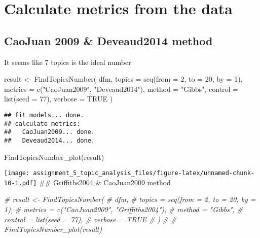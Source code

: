 \documentclass[
]{article}
\newenvironment{Shaded}{\begin{snugshade}}{\end{snugshade}}
\newcommand{\AttributeTok}[1]{\textcolor[rgb]{0.77,0.63,0.00}{#1}}
\newcommand{\CommentTok}[1]{\textcolor[rgb]{0.56,0.35,0.01}{\textit{#1}}}
\newcommand{\ConstantTok}[1]{\textcolor[rgb]{0.00,0.00,0.00}{#1}}
\newcommand{\DecValTok}[1]{\textcolor[rgb]{0.00,0.00,0.81}{#1}}
\newcommand{\FunctionTok}[1]{\textcolor[rgb]{0.00,0.00,0.00}{#1}}
\newcommand{\NormalTok}[1]{#1}
\newcommand{\OtherTok}[1]{\textcolor[rgb]{0.56,0.35,0.01}{#1}}
\newcommand{\StringTok}[1]{\textcolor[rgb]{0.31,0.60,0.02}{#1}}
\begin{document}
\hypertarget{calculate-metrics-from-the-data}{%
\section{Calculate metrics from the
data}\label{calculate-metrics-from-the-data}}

\hypertarget{caojuan-2009-deveaud2014-method}{%
\subsection{CaoJuan 2009 \& Deveaud2014
method}\label{caojuan-2009-deveaud2014-method}}

It seems like 7 topics is the ideal number

\begin{Shaded}
\begin{Highlighting}[]
\NormalTok{result }\OtherTok{\textless{}{-}} \FunctionTok{FindTopicsNumber}\NormalTok{(}
\NormalTok{  dfm,}
  \AttributeTok{topics =} \FunctionTok{seq}\NormalTok{(}\AttributeTok{from =} \DecValTok{2}\NormalTok{, }\AttributeTok{to =} \DecValTok{20}\NormalTok{, }\AttributeTok{by =} \DecValTok{1}\NormalTok{),}
  \AttributeTok{metrics =} \FunctionTok{c}\NormalTok{(}\StringTok{"CaoJuan2009"}\NormalTok{,  }\StringTok{"Deveaud2014"}\NormalTok{),}
  \AttributeTok{method =} \StringTok{"Gibbs"}\NormalTok{,}
  \AttributeTok{control =} \FunctionTok{list}\NormalTok{(}\AttributeTok{seed =} \DecValTok{77}\NormalTok{),}
  \AttributeTok{verbose =} \ConstantTok{TRUE}
\NormalTok{)}
\end{Highlighting}
\end{Shaded}

\begin{verbatim}
## fit models... done.
## calculate metrics:
##   CaoJuan2009... done.
##   Deveaud2014... done.
\end{verbatim}

\begin{Shaded}
\begin{Highlighting}[]
\FunctionTok{FindTopicsNumber\_plot}\NormalTok{(result)}
\end{Highlighting}
\end{Shaded}

\texttt{[image: assignment\_5\_topic\_analysis\_files/figure-latex/unnamed-chunk-10-1.pdf]}
\#\# Griffiths2004 \& CaoJuan2009 method

\begin{Shaded}
\begin{Highlighting}[]
\CommentTok{\# result \textless{}{-} FindTopicsNumber(}
\CommentTok{\#   dfm,}
\CommentTok{\#   topics = seq(from = 2, to = 20, by = 1),}
\CommentTok{\#   metrics = c("CaoJuan2009", "Griffiths2004"),}
\CommentTok{\#   method = "Gibbs",}
\CommentTok{\#   control = list(seed = 77),}
\CommentTok{\#   verbose = TRUE}
\CommentTok{\# )}
\CommentTok{\# }
\CommentTok{\# FindTopicsNumber\_plot(result)}
\end{Highlighting}
\end{Shaded}
\end{document}
